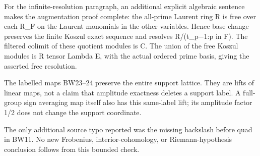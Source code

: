 \documentclass[
]{article}
\begin{document}
For the infinite-resolution paragraph, an additional explicit algebraic
sentence makes the augmentation proof complete: the all-prime Laurent
ring R is free over each R\_F on the Laurent monomials in the other
variables. Hence base change preserves the finite Koszul exact sequence
and resolves R/(t\_p−1:p in F). The filtered colimit of these quotient
modules is C. The union of the free Koszul modules is R tensor Lambda E,
with the actual ordered prime basis, giving the asserted free
resolution.

The labelled maps BW23--24 preserve the entire support lattice. They are
lifts of linear maps, not a claim that amplitude exactness deletes a
support label. A full-group sign averaging map itself also has this
same-label lift; its amplitude factor 1/2 does not change the support
coordinate.

The only additional source typo reported was the missing backslash
before quad in BW11. No new Frobenius, interior-cohomology, or
Riemann-hypothesis conclusion follows from this bounded check.
\end{document}
